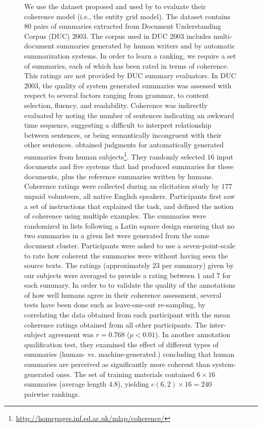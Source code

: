 \begin{figure}[!t]
We use the dataset proposed and used by  to evaluate their  coherence model (i.e., the entity grid model).  
The dataset contains $80$ pairs of summaries extracted from Document Understanding Corpus (DUC) $2003$. 
The corpus used in DUC 2003 includes multi-document summaries generated by human writers and by automatic summarization systems. 
In order to learn a ranking, we require a set of summaries, each of which has been rated in terms of coherence. 
This ratings are not provided by DUC summary evaluators. 
In DUC $2003$, the quality of system generated summaries was assessed with respect to several factors ranging from grammar, to content selection, fluency, and readability. 
Coherence was indirectly evaluated by noting the number of sentences indicating an awkward time sequence, suggesting a difficult to interpret relationship between sentences, or being semantically incongruent with their other sentences. 
 obtained judgments for automatically generated summaries from human subjects\footnote{\url{http://homepages.inf.ed.ac.uk/mlap/coherence/}}.
They randomly selected $16$ input documents and five systems that had produced summaries for these documents, plus the reference summaries written by humans. 
Coherence ratings were collected during an elicitation study by $177$ unpaid volunteers, all native English speakers. 
Participants first saw a set of instructions that explained the task, and defined the notion of coherence using multiple examples. 
The summaries were randomized in lists following a Latin square design ensuring that no two summaries in a given list were generated from the same document cluster. 
Participants were asked to use a seven-point-scale to rate how coherent the summaries were without having seen the source texts. 
The ratings (approximately $23$ per summary) given by our subjects were averaged to provide a rating between $1$ and $7$ for each summary. 
In order to to validate the quality of the annotations of how well humans agree in their coherence assessment, several tests have been done such as leave-one-out re-sampling, by correlating the data obtained from each participant with the mean coherence ratings obtained from all other participants. 
The inter-subject agreement was $r = 0.768$ ($p < 0.01$). 
In another annotation qualification test, they examined the effect of different types of summaries (human- vs. machine-generated.) concluding that human summaries are perceived as significantly more coherent than system-generated ones. 
The set of training materials contained $6 × 16$ summaries (average length $4.8$), yielding $c(6,2) × 16 = 240$ pairwise rankings. 

\end{figure}
